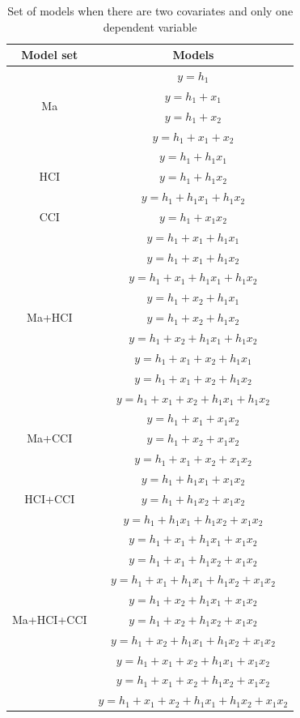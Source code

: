 \begin{table}[]
\caption{}
\caption*{\footnotesize Set of models when there are two covariates and only one dependent variable}
\centering
\begin{tabular}{cc}
\toprule
Model set & Models \\  
\midrule
\multirow{4}{*}{Ma} & $y=h_1$ \\ & $y=h_1+x_1$ \\ & $y=h_1+x_2$ \\ & $y=h_1+x_1+x_2$ & \\ 
\multirow{3}{*}{HCI} & $y=h_1+h_1x_1$ \\ & $y=h_1+h_1x_2$ \\ & $y=h_1+h_1x_1+h_1x_2$ & \\
CCI & $y=h_1+x_1x_2$ & \\ 
\multirow{9}{*}{Ma+HCI} & $y=h_1+x_1+h_1x_1$\\ & $y=h_1+x_1+h_1x_2$\\ & $y=h_1+x_1+h_1x_1+h_1x_2$\\ & $y=h_1+x_2+h_1x_1$\\ & $y=h_1+x_2+h_1x_2$\\ & $y=h_1+x_2+h_1x_1+h_1x_2$\\ & $y=h_1+x_1+x_2+h_1x_1$\\ & $y=h_1+x_1+x_2+h_1x_2$\\ & $y=h_1+x_1+x_2+h_1x_1+h_1x_2$ & \\ 
\multirow{3}{*}{Ma+CCI} & $y=h_1+x_1+x_1x_2$\\ & $y=h_1+x_2+x_1x_2$\\ & $y=h_1+x_1+x_2+x_1x_2$ & \\
\multirow{3}{*}{HCI+CCI} & $y=h_1+h_1x_1+x_1x_2$\\ & $y=h_1+h_1x_2+x_1x_2$\\ & $y=h_1+h_1x_1+h_1x_2+x_1x_2$ & \\
\multirow{9}{*}{Ma+HCI+CCI} & $y=h_1+x_1+h_1x_1+x_1x_2$\\ & $y=h_1+x_1+h_1x_2+x_1x_2$\\ & $y=h_1+x_1+h_1x_1+h_1x_2+x_1x_2$\\ & $y=h_1+x_2+h_1x_1+x_1x_2$\\ & $y=h_1+x_2+h_1x_2+x_1x_2$\\ & $y=h_1+x_2+h_1x_1+h_1x_2+x_1x_2$\\ & $y=h_1+x_1+x_2+h_1x_1+x_1x_2$\\ & $y=h_1+x_1+x_2+h_1x_2+x_1x_2$\\ & $y=h_1+x_1+x_2+h_1x_1+h_1x_2+x_1x_2$ \\ 
\bottomrule
\end{tabular}
\end{table}

